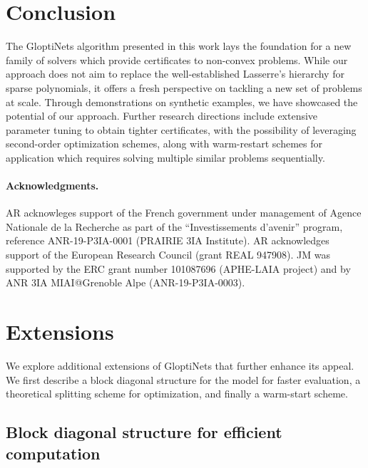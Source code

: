 \documentclass{article}
\begin{document}
\section{Conclusion}

The GloptiNets algorithm presented in this work lays the foundation for a new family of solvers which provide certificates to non-convex problems. While our approach does not aim to replace the well-established Lasserre's hierarchy for sparse polynomials, it offers a fresh perspective on tackling a new set of problems at scale. Through demonstrations on synthetic examples, we have showcased the potential of our approach. Further research directions include extensive parameter tuning to obtain tighter certificates, with the possibility of leveraging second-order optimization schemes, along with warm-restart schemes for application which requires solving multiple similar problems sequentially.

\newpage

\paragraph{Acknowledgments.}{
  AR acknowleges support of the French government under management of Agence Nationale de la Recherche as part of the ``Investissements d'avenir'' program, reference ANR-19-P3IA-0001 (PRAIRIE 3IA Institute). AR acknowledges support of the European Research Council (grant REAL 947908). JM was supported by the ERC grant number 101087696 (APHE-LAIA project) and by ANR 3IA MIAI@Grenoble Alpe (ANR-19-P3IA-0003).
}




\newpage

\appendix


\section{Extensions}
\label{sec:extensions}

We explore additional extensions of GloptiNets that further enhance its appeal. We first describe a block diagonal structure for the model for faster evaluation, a theoretical splitting scheme for optimization, and finally a warm-start scheme.

\subsection{Block diagonal structure for efficient computation}
\end{document}
